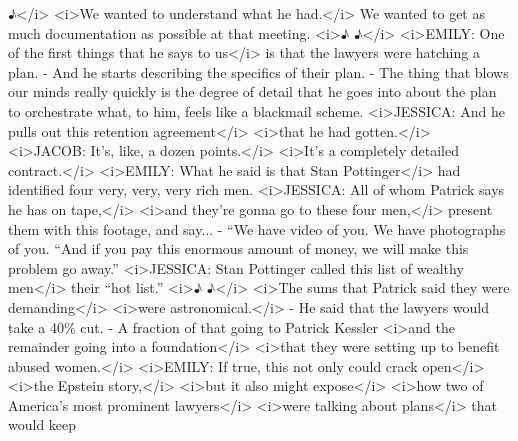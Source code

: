 \begin{itemize}
  ♪\textless{}/i\textgreater{} \textless{}i\textgreater{}We wanted to
  understand what he had.\textless{}/i\textgreater{} We wanted to get as
  much documentation as possible at that meeting.
  \textless{}i\textgreater{}♪ ♪\textless{}/i\textgreater{}
  \textless{}i\textgreater{}EMILY: One of the first things that he says
  to us\textless{}/i\textgreater{} is that the lawyers were hatching a
  plan. - And he starts describing the specifics of their plan. - The
  thing that blows our minds really quickly is the degree of detail that
  he goes into about the plan to orchestrate what, to him, feels like a
  blackmail scheme. \textless{}i\textgreater{}JESSICA: And he pulls out
  this retention agreement\textless{}/i\textgreater{}
  \textless{}i\textgreater{}that he had
  gotten.\textless{}/i\textgreater{} \textless{}i\textgreater{}JACOB:
  It's, like, a dozen points.\textless{}/i\textgreater{}
  \textless{}i\textgreater{}It's a completely detailed
  contract.\textless{}/i\textgreater{} \textless{}i\textgreater{}EMILY:
  What he said is that Stan Pottinger\textless{}/i\textgreater{} had
  identified four very, very, very rich men.
  \textless{}i\textgreater{}JESSICA: All of whom Patrick says he has on
  tape,\textless{}/i\textgreater{} \textless{}i\textgreater{}and they're
  gonna go to these four men,\textless{}/i\textgreater{} present them
  with this footage, and say... - ``We have video of you. We have
  photographs of you. ``And if you pay this enormous amount of money, we
  will make this problem go away.'' \textless{}i\textgreater{}JESSICA:
  Stan Pottinger called this list of wealthy
  men\textless{}/i\textgreater{} their ``hot list.''
  \textless{}i\textgreater{}♪ ♪\textless{}/i\textgreater{}
  \textless{}i\textgreater{}The sums that Patrick said they were
  demanding\textless{}/i\textgreater{} \textless{}i\textgreater{}were
  astronomical.\textless{}/i\textgreater{} - He said that the lawyers
  would take a 40\% cut. - A fraction of that going to Patrick Kessler
  \textless{}i\textgreater{}and the remainder going into a
  foundation\textless{}/i\textgreater{} \textless{}i\textgreater{}that
  they were setting up to benefit abused
  women.\textless{}/i\textgreater{} \textless{}i\textgreater{}EMILY: If
  true, this not only could crack open\textless{}/i\textgreater{}
  \textless{}i\textgreater{}the Epstein
  story,\textless{}/i\textgreater{} \textless{}i\textgreater{}but it
  also might expose\textless{}/i\textgreater{}
  \textless{}i\textgreater{}how two of America's most prominent
  lawyers\textless{}/i\textgreater{} \textless{}i\textgreater{}were
  talking about plans\textless{}/i\textgreater{} that would keep

\end{itemize}
